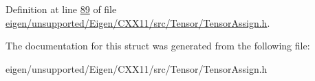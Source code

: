 Definition at line \hyperlink{eigen_2unsupported_2_eigen_2_c_x_x11_2src_2_tensor_2_tensor_assign_8h_source_l00089}{89} of file \hyperlink{eigen_2unsupported_2_eigen_2_c_x_x11_2src_2_tensor_2_tensor_assign_8h_source}{eigen/unsupported/\+Eigen/\+C\+X\+X11/src/\+Tensor/\+Tensor\+Assign.\+h}.



The documentation for this struct was generated from the following file\+:\begin{DoxyCompactItemize}
\item 
eigen/unsupported/\+Eigen/\+C\+X\+X11/src/\+Tensor/\+Tensor\+Assign.\+h\end{DoxyCompactItemize}
